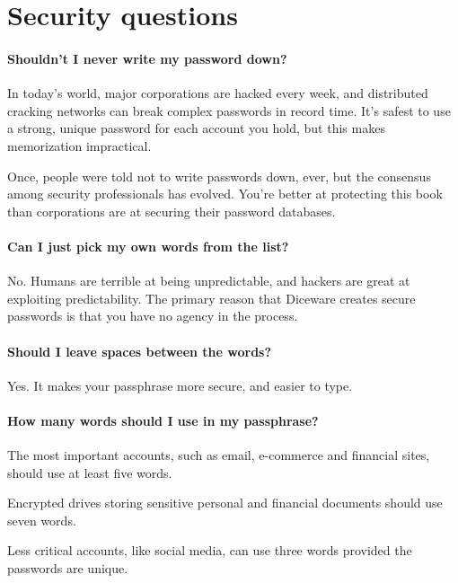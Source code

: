 \chapter*{Security questions}
\label{ch:qna}

\subsubsection{Shouldn't I never write my password down?}

In today's world, major corporations are hacked every week, and distributed cracking networks can break complex passwords in record time. It's safest to use a strong, unique password for each account you hold, but this makes memorization impractical. 

Once, people were told not to write passwords down, ever, but the consensus among security professionals has evolved. You're better at protecting this book than corporations are at securing their password databases. 

\subsubsection{Can I just pick my own words from the list?}

No. Humans are terrible at being unpredictable, and hackers are great at exploiting predictability. The primary reason that Diceware creates secure passwords is that you have no agency in the process.

\subsubsection{Should I leave spaces between the words?}

Yes. It makes your passphrase more secure, and easier to type.

\subsubsection{How many words should I use in my passphrase?}

The most important accounts, such as email, e-commerce and financial sites, should use at least five words.

Encrypted drives storing sensitive personal and financial documents should use seven words.

Less critical accounts, like social media, can use three words provided the passwords are unique.

